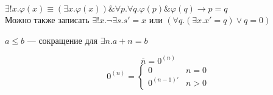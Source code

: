 \documentclass[english]{article}
\begin{document}
\begin{definition}
	\(\exists! x.\varphi(x) \equiv (\exists x. \varphi(x))\&\forall p.\forall q. \varphi(p)\&\varphi(q) \to p = q\) \\
	Можно также записать \(\exists ! x.\neg \exists s. s' = x\) или \((\forall q.(\exists x. x' = q)\vee q= 0)\)
\end{definition}
\begin{definition}
	\(a \le b\) --- сокращение для \(\exists n. a + n = b\)
\end{definition}
\begin{definition}
	\[ \overline{n} = 0^{(n)}\]
	\[ 0^{(n)} = \begin{cases}
			0            & n = 0 \\
			0^{(n - 1)'} & n > 0
		\end{cases}\]
\end{definition}
\end{document}
